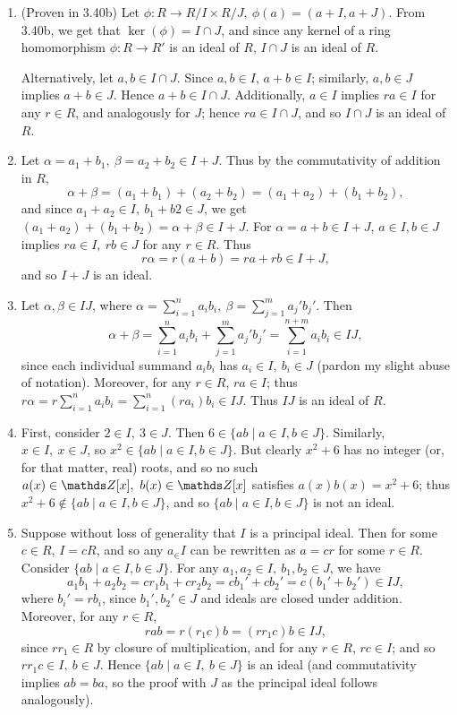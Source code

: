 \documentclass{homework}
\begin{document}
\begin{solution}
  \begin{enumerate}[label=(\alph*)]
    \item (Proven in 3.40b) Let $\phi:R\to R / I \times  R / J,\ \phi(a)=(a+I,a+J)$. From 3.40b, we
      get that $\ker(\phi)=I\cap J$, and since any kernel of a ring homomorphism $\phi:R\to R'$ is
      an ideal of $R$, $I\cap J$ is an ideal of $R$.

      Alternatively, let $a,b\in I\cap J$. Since $a,b\in I$, $a+b\in I$; similarly, $a,b\in J$
      implies $a+b\in J$. Hence $a+b\in I\cap J$. Additionally, $a\in I$ implies $ra\in I$ for any
      $r\in R$, and analogously for $J$; hence $ra\in I\cap J$, and so $I\cap J$ is an ideal of $R$.

    \item Let $\alpha=a_1+b_1,\ \beta=a_2+b_2\in I+J$. Thus by the commutativity of addition in $R$,
      \[
        \alpha+\beta=(a_1+b_1)+(a_2+b_2)=(a_1+a_2)+(b_1+b_2)
      ,\] and since $a_1+a_2\in I,\ b_1+b2\in J$, we get $(a_1+a_2)+(b_1+b_2)=\alpha+\beta\in I+J$.
      For $\alpha=a+b\in I+J$, $a\in I, b\in J$ implies $ra\in I,\ rb\in J$ for any $r\in R$. Thus \[
        r\alpha=r(a+b)=ra+rb\in I+J
      ,\] and so $I+J$ is an ideal.

    \item Let $\alpha,\beta\in IJ$, where $\alpha=\sum_{i=1}^{n} a_ib_i,\ \beta=\sum_{j=1}^{m}
      a_j'b_j'$. Then \[\alpha+\beta=\sum_{i=1}^{n} a_ib_i+\sum_{j=1}^{m}a_j'b_j'=\sum_{i=1}^{n+m}
      a_ib_i\in IJ,\] since each individual summand $a_ib_i$ has $a_i\in I,\ b_i\in J$ (pardon my
      slight abuse of notation). Moreover, for any $r\in R$, $ra\in I$; thus $r\alpha=r
      \sum_{i=1}^{n} a_ib_i=\sum_{i=1}^{n} (ra_i)b_i\in IJ$. Thus $IJ$ is an ideal of $R$.
    \item First, consider $2\in I,\ 3\in J$. Then $6\in \{ab\mid a\in I,b\in J\}$. Similarly, $x\in
      I,\ x\in J$, so $x^2\in \{ab\mid a\in I,b\in J\}$. But clearly $x^2+6$ has no integer (or, for
      that matter, real) roots, and so no such $a(x)\in \Z[x],\ b(x)\in \Z[x]$ satisfies
      $a(x)b(x)=x^2+6$; thus $x^2+6\not\in \{ab\mid a\in I,b\in J\} $, and so $\{ab\mid a\in I,b\in
      J\} $ is not an ideal.
    \item Suppose without loss of generality that $I$ is a principal ideal. Then for some $c\in R$,
      $I=cR$, and so any $a_\in I$ can be rewritten as $a=cr$ for some $r\in R$. Consider $\{ab\mid
      a\in I, b\in J\} $. For any $a_1,a_2\in I,\ b_1,b_2\in J$, we have \[
        a_1b_1+a_2b_2=cr_1b_1+cr_2b_2=c b_1'+c b_2'=c(b_1'+b_2')\in IJ
      ,\] where $b_i'=rb_i$, since $b_1',b_2'\in J$ and ideals are closed under addition. Moreover,
      for any $r\in R$, \[
        rab=r(r_1c)b=(rr_1c)b\in IJ
      ,\]  since $rr_1\in R$ by closure of multiplication, and for any $r\in R$, $rc\in I$; and so
      $rr_1c\in I,\ b\in J$. Hence $\{ab\mid a\in I,\ b\in J\} $ is an ideal (and commutativity
      implies $ab=ba$, so the proof with $J$ as the principal ideal follows analogously).
  \end{enumerate}
\end{solution}
\end{document}
